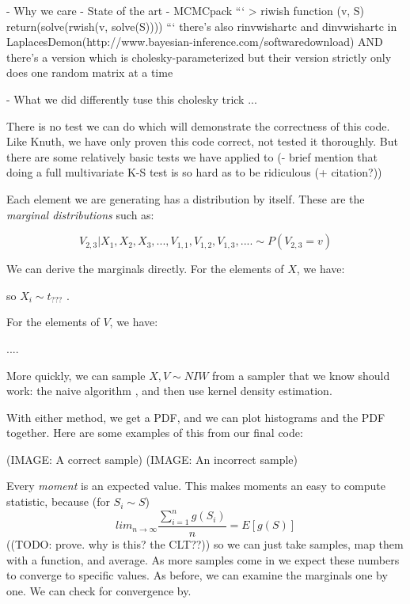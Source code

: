 \documentclass[english]{report}
\begin{document}

- Why we care
- State of the art
  - MCMCpack
  ```
  > riwish
  function (v, S) 
  {
      return(solve(rwish(v, solve(S))))
      }
   ```   
 there's also rinvwishartc and dinvwishartc in LaplacesDemon(http://www.bayesian-inference.com/softwaredownload) 
   AND there's a version which is cholesky-parameterized
  but their version strictly only does one random matrix at a time
  
- What we did differently
  tuse this cholesky trick ... 



There is no test we can do which will demonstrate the correctness of this code.
Like Knuth, we have only proven this code correct, not tested it thoroughly.
But there are some relatively basic tests we have applied to 
(- brief mention that doing a full multivariate K-S test is so hard as to be ridiculous (+ citation?))

Each element we are generating has a distribution by itself. These are the \emph{marginal distributions} such as:

$$ V_{2,3} | X_1, X_2, X_3, ..., V_{1,1}, V_{1,2}, V_{1,3} , ....  \sim P(V_{2,3} = v) $$

We can derive the marginals directly. For the elements of $X$, we have:


so  $X_i \sim t_{???}$ .

For the elements of $V$, we have:

....


More quickly, we can sample $X,V \sim NIW$ from a sampler that we know should work: the naive algorithm %
  , and then use kernel density estimation.
  
With either method, we get a PDF, and we can plot histograms and the PDF together. Here are some examples of this from our final code:

(IMAGE: A correct sample)
(IMAGE: An incorrect sample)


Every \emph{moment} is an expected value. This makes moments an easy to compute statistic,
 because (for $ S_i \sim S $)
$$ lim_{n \rightarrow \infty} \frac{\sum_{i=1}^n g(S_i)}{n} = E[g(S)] $$
  ((TODO: prove. why is this? the CLT??))
so we can just take samples, map them with a function, and average. As more samples come in we expect these numbers to converge to specific values. As before, we can examine the marginals one by one. We can check for convergence by.
\end{document}
